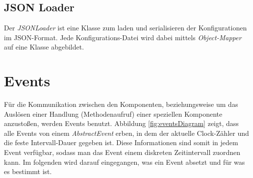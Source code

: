 \subsection{JSON Loader}
Der \textit{JSONLoader} ist eine Klasse zum laden und serialisieren der Konfigurationen im JSON-Format. Jede Konfigurations-Datei wird dabei mittels \textit{Object-Mapper} auf eine Klasse abgebildet.

\section{Events}
\label{sec:Aufbau:Events}
Für die Kommunikation zwischen den Komponenten, beziehungsweise um das Auslösen einer Handlung (Methodenaufruf) einer speziellen Komponente anzustoßen, werden Events benutzt. Abbildung \ref{fig:eventsDiagram} zeigt, dass alle Events von einem \textit{AbstractEvent} erben, in dem der aktuelle Clock-Zähler und die feste Intervall-Dauer gegeben ist. Diese Informationen sind somit in jedem Event verfügbar, sodass man das Event einem diskreten Zeitintervall zuordnen kann. Im folgenden wird darauf eingegangen, was ein Event absetzt und für was es bestimmt ist.



